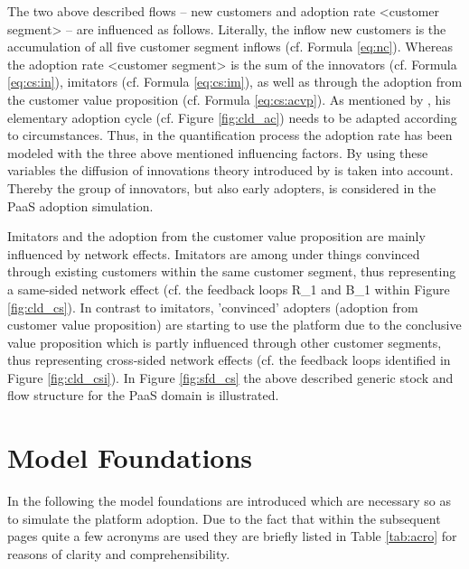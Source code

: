 The two above described flows -- new customers and adoption rate <customer segment>  -- are influenced as follows. Literally, the inflow new customers is the accumulation of all five customer segment inflows (cf. Formula \ref{eq:nc}). Whereas the adoption rate <customer segment> is the sum of the innovators (cf. Formula \ref{eq:cs:in}), imitators (cf. Formula \ref{eq:cs:im}), as well as through the adoption from the customer value proposition (cf. Formula \ref{eq:cs:acvp}). As mentioned by \citet[p. 20]{Sterman2001}, his elementary adoption cycle (cf. Figure \ref{fig:cld_ac}) needs to be adapted according to circumstances. Thus, in the quantification process the adoption rate has been modeled with the three above mentioned influencing factors. By using these variables the diffusion of innovations theory introduced by \citet{Rogers2003} is taken into account. Thereby the group of innovators, but also early adopters, is considered in the \ac{PaaS} adoption simulation.

Imitators and the adoption from the customer value proposition are mainly influenced by network effects. Imitators are among under things convinced through existing customers within the same customer segment, thus representing a same-sided network effect (cf. the feedback loops R\_1 and B\_1 within Figure \ref{fig:cld_cs}). In contrast to imitators, 'convinced' adopters (adoption from customer value proposition) are starting to use the platform due to the conclusive value proposition which is partly influenced through other customer segments, thus representing cross-sided network effects (cf. the feedback loops identified in Figure \ref{fig:cld_csi}). In Figure \ref{fig:sfd_cs} the above described generic stock and flow structure for the \ac{PaaS} domain is illustrated.

\section{Model Foundations}\label{ch:sfd:mf}
In the following the model foundations are introduced which are necessary so as to simulate the platform adoption. Due to the fact that within the subsequent pages quite a few acronyms are used they are briefly listed in Table \ref{tab:acro} for reasons of clarity and comprehensibility.


